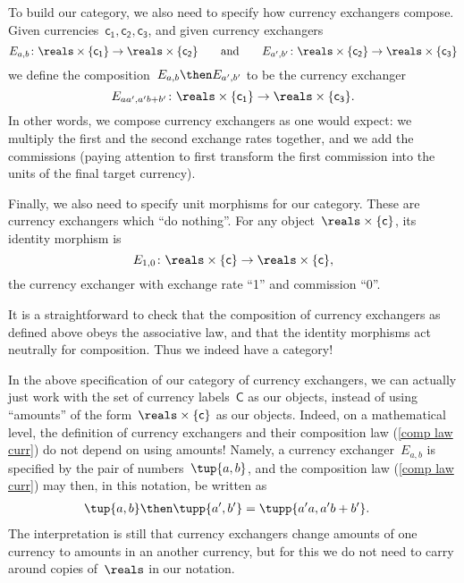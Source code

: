 To build our category, we also need to specify how currency exchangers compose. Given currencies~$\mathsf{c_1}, \mathsf{c_2}, \mathsf{c_3}$, and given currency exchangers
\begin{equation*}
  E_{a,b} \colon \reals \times \{\mathsf{c_1} \} \rightarrow \reals \times \{ \mathsf{c_2}\}
  \qquad \text{and} \qquad
  E_{a',b'} \colon \reals \times \{\mathsf{c_2}\} \rightarrow \reals \times \{\mathsf{c_3}\}
\end{equation*}
we define the composition~$E_{a,b} \then E_{a',b'}$ to be the currency exchanger
\begin{equation}
  \label{comp law curr}
  E_{aa',a'b + b'} \colon \reals \times \{\mathsf{c_1}\} \rightarrow \reals \times \{\mathsf{c_3}\}.
\end{equation}
In other words, we compose currency exchangers as one would expect: we multiply the first and the second exchange rates together, and we add the commissions (paying attention to first transform the first commission into the units of the final target currency).

Finally, we also need to specify unit morphisms for our category. These are currency exchangers which ``do nothing''. For any object~$\reals \times \{ \mathsf{c}\}$, its identity morphism is
\begin{equation*}
  E_{1,0} \colon \reals \times \{\mathsf{c}\} \rightarrow \reals \times \{\mathsf{c}\},
\end{equation*}
the currency exchanger with exchange rate ``1'' and commission ``0''.

It is a straightforward to check that the composition of currency exchangers as defined above obeys the associative law, and that the identity morphisms act neutrally for composition. Thus we indeed have a category!

\begin{remark}
  In the above specification of our category of currency exchangers, we can actually just work with the set of currency labels~$\mathsf{C}$ as our objects, instead of using ``amounts'' of the form~$\reals \times \{\mathsf{c}\}$ as our objects. Indeed, on a mathematical level, the definition of currency exchangers and their composition law (\cref{comp law curr}) do not depend on using amounts! Namely, a currency exchanger~$E_{a,b}$ is specified by the pair of numbers~$\tup{a, b}$, and the composition law (\ref{comp law curr}) may then, in this notation, be written as
  \begin{equation}
    \begin{aligned}
      \label{eq:currencycomp}
      \tup{a,b}\then \tupp{a',b'}&=\tupp{a' a, a' b + b'}.
    \end{aligned}
  \end{equation}
  The interpretation is still that currency exchangers change amounts of one currency to amounts in an another currency, but for this we do not need to carry around copies of~$\reals$ in our notation.
\end{remark}

